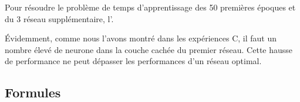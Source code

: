   Pour résoudre le problème de temps d'apprentissage des 50 premières époques et du 3 réseau supplémentaire,
  l'.
  
  
  Évidemment, comme nous l'avons montré dans les expériences C, il faut un nombre élevé de neurone dans la couche cachée du premier réseau.
  Cette hausse de performance ne peut dépasser les performances d'un réseau optimal.
  
  

  \newpage 
  \subsection{Formules}
    
    
    
    


